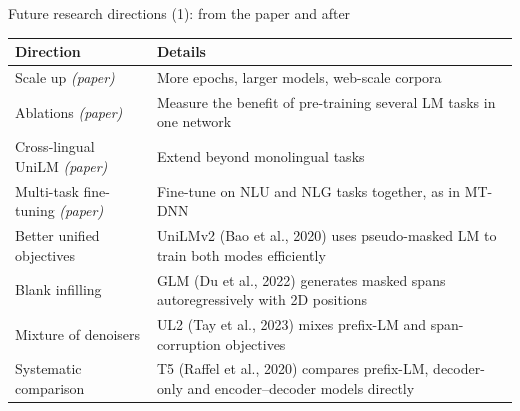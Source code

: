 \documentclass[aspectratio=169,11pt]{beamer}
\begin{document}
\begin{frame}{Future research directions (1): from the paper and after}
  \small
  \begin{tabularx}{\textwidth}{@{}lX@{}}
    \toprule
    Direction & Details\\
    \midrule
    Scale up \emph{(paper)} & More epochs, larger models, web-scale corpora\\
    Ablations \emph{(paper)} & Measure the benefit of pre-training several LM tasks in one network\\
    Cross-lingual UniLM \emph{(paper)} & Extend beyond monolingual tasks\\
    Multi-task fine-tuning \emph{(paper)} & Fine-tune on NLU and NLG tasks together, as in MT-DNN\\
    Better unified objectives & UniLMv2 (Bao et al., 2020) uses pseudo-masked LM to train both modes efficiently\\
    Blank infilling & GLM (Du et al., 2022) generates masked spans autoregressively with 2D positions\\
    Mixture of denoisers & UL2 (Tay et al., 2023) mixes prefix-LM and span-corruption objectives\\
    Systematic comparison & T5 (Raffel et al., 2020) compares prefix-LM, decoder-only and encoder--decoder models directly\\
    \bottomrule
  \end{tabularx}
\end{frame}
\end{document}
